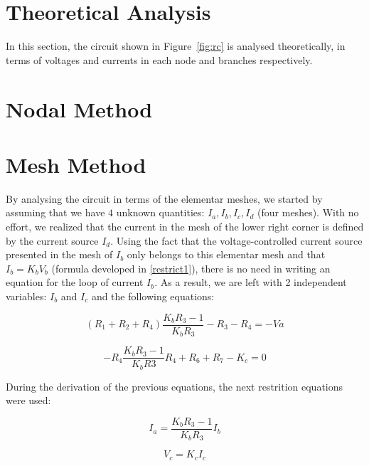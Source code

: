 \section{Theoretical Analysis}
\label{sec:analysis}

In this section, the circuit shown in Figure~\ref{fig:rc} is analysed
theoretically, in terms of voltages and currents in each node and branches respectively.


\section{Nodal Method}






\section{Mesh Method}

By analysing the circuit in terms of the elementar meshes, we started by assuming that we have $4$ unknown quantities: $I_a, I_b, I_c, I_d$ (four meshes).
With no effort, we realized that the current in the mesh of the lower right corner is defined by the current source $I_d$.
Using the fact that the voltage-controlled current source presented in the mesh of $I_b$ only belongs to this elementar mesh and that $I_b = K_b V_b$ (formula developed in \ref{restrict1}), there is no need in writing an equation for the loop of current $I_b$.
As a result, we are left with 2 independent variables: $I_b$ and $I_c$ and the following equations:


\begin{equation}
  (R_1 + R_2 + R_4) \frac{K_b R_3 -1}{K_b R_3}  - R_3  - R_4 = -Va
  \label{mesh1}
\end{equation}

\begin{equation}
  -R_4 \frac{K_b R_3 - 1}{K_b R3} R_4 + R_6 + R_7 - K_c = 0
  \label{mesh2}
\end{equation}

During the derivation of the previous equations, the next restrition equations were used:

\begin{equation}
  I_a = \frac{K_b R_3 -1}{K_b R_3} I_b
  \label{restrict1}
\end{equation}

\begin{equation}
  V_c = K_c I_c
  \label{restrict2}
\end{equation}

